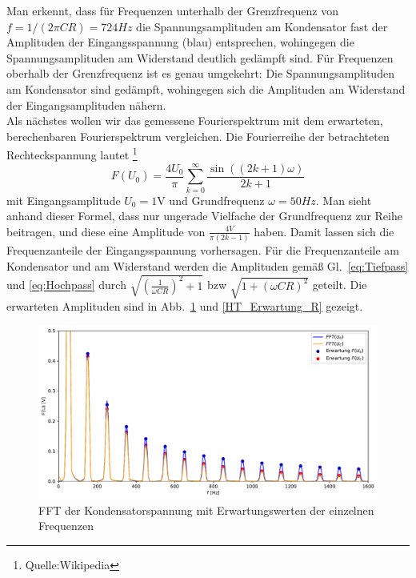 \documentclass[12pt,a4paper]{article}
\begin{document}
Man erkennt, dass für Frequenzen unterhalb der Grenzfrequenz von  $f=1/(2\pi CR)=724Hz$ die Spannungsamplituden am Kondensator fast der Amplituden der Eingangsspannung (blau) entsprechen, wohingegen die Spannungsamplituden am Widerstand deutlich gedämpft sind. Für Frequenzen oberhalb der Grenzfrequenz ist es genau umgekehrt: Die Spannungsamplituden am Kondensator sind gedämpft, wohingegen sich die Amplituden am Widerstand der Eingangsamplituden nähern.\\
Als nächstes wollen wir das gemessene Fourierspektrum mit dem erwarteten, berechenbaren Fourierspektrum vergleichen. Die Fourierreihe der betrachteten Rechteckspannung lautet
\footnote{Quelle:Wikipedia}
\begin{equation}
F(U_0)=\frac{4U_0}{\pi}\sum_{k=0}^{\infty}{\frac{\sin((2k+1)\omega)}{2k+1}}
\end{equation}
mit Eingangsamplitude $U_0=1$V und Grundfrequenz $\omega=50Hz$. Man sieht anhand dieser Formel, dass nur ungerade Vielfache der Grundfrequenz zur Reihe beitragen, und diese eine Amplitude von $\frac{4V}{\pi(2k-1)}$ haben. Damit lassen sich die Frequenzanteile der Eingangsspannung vorhersagen. Für die Frequenzanteile am Kondensator und am Widerstand werden die Amplituden gemäß Gl.~\ref{eq:Tiefpass} und \ref{eq:Hochpass} durch $\sqrt{(\frac{1}{\omega CR})^2+1}$ bzw $\sqrt{1+(\omega CR)^2}$ geteilt. Die erwarteten Amplituden sind in Abb.~\ref{HT_Erwartung_C} und \ref{HT_Erwartung_R} gezeigt.
\begin{figure}[H]
	\centering
	\includegraphics[width=1\textwidth]{Python/Fourier_UC_Erwartung.pdf}
	\caption{FFT der Kondensatorspannung mit Erwartungswerten der einzelnen Frequenzen}
	\label{HT_Erwartung_C}
\end{figure}
\end{document}
